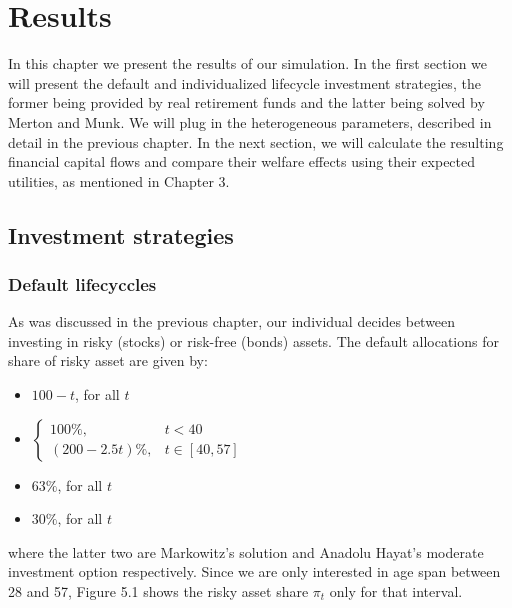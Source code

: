 \chapter{Results}
\label{results}

In this chapter we present the results of our simulation. In the first section we will present the default and individualized lifecycle investment strategies, the former being provided by real retirement funds and the latter being solved by Merton and Munk. We will plug in the heterogeneous parameters, described in detail in the previous chapter. In the next section, we will calculate the resulting financial capital flows and compare their welfare effects using their expected utilities, as mentioned in Chapter 3. 

\section{Investment strategies}
\subsection{Default lifecyccles}
As was discussed in the previous chapter, our individual decides between investing in risky (stocks) or risk-free (bonds) assets. The default allocations for share of risky asset are given by:

\begin{itemize}
	\item $100-t$, for all $t$
	\item $\begin{cases} 100\%, & t<40\\(200-2.5t)\%, & t\in[40,57]\end{cases}$
	\item $63\%$, for all $t$
	\item $30\%$, for all $t$
\end{itemize}

where the latter two are Markowitz's solution and Anadolu Hayat's moderate investment option respectively. Since we are only interested in age span between 28 and 57, Figure 5.1 shows the risky asset share $\pi_t$ only for that interval. 

